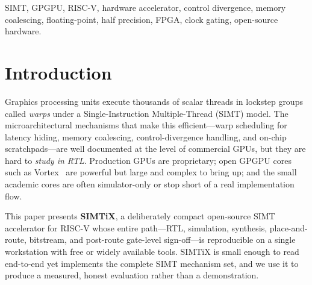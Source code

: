 \documentclass[conference]{IEEEtran}
\begin{document}
\begin{IEEEkeywords}
SIMT, GPGPU, RISC-V, hardware accelerator, control divergence, memory
coalescing, floating-point, half precision, FPGA, clock gating, open-source
hardware.
\end{IEEEkeywords}

\section{Introduction}
Graphics processing units execute thousands of scalar threads in lockstep groups
called \emph{warps} under a Single-Instruction Multiple-Thread (SIMT) model. The
microarchitectural mechanisms that make this efficient---warp scheduling for
latency hiding, memory coalescing, control-divergence handling, and on-chip
scratchpads---are well documented at the level of commercial GPUs, but they are
hard to \emph{study in RTL}. Production GPUs are proprietary; open GPGPU cores
such as Vortex~\cite{vortex} are powerful but large and complex to bring up; and
the small academic cores are often simulator-only or stop short of a real
implementation flow.

This paper presents \textbf{SIMTiX}, a deliberately compact open-source SIMT
accelerator for RISC-V whose entire path---RTL, simulation, synthesis,
place-and-route, bitstream, and post-route gate-level sign-off---is reproducible
on a single workstation with free or widely available tools. SIMTiX is small
enough to read end-to-end yet implements the complete SIMT mechanism set, and we
use it to produce a measured, honest evaluation rather than a demonstration.
\end{document}

